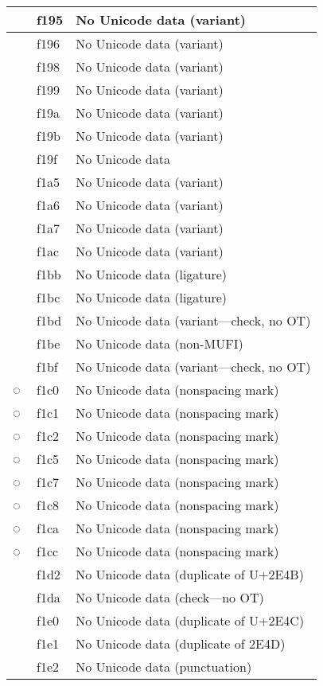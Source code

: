 \documentclass[12pt,letterpaper,openany]{book}
\begin{document}
\begin{center}
\begin{supertabular}{|m{0.25in}|m{0.5in}|m{4in}|}
 & f195 & No Unicode data (variant)\\\hline
 & f196 & No Unicode data (variant)\\\hline
 & f198 & No Unicode data (variant)\\\hline
 & f199 & No Unicode data (variant)\\\hline
 & f19a & No Unicode data (variant)\\\hline
 & f19b & No Unicode data (variant)\\\hline
 & f19f & No Unicode data\\\hline
 & f1a5 & No Unicode data (variant)\\\hline
 & f1a6 & No Unicode data (variant)\\\hline
 & f1a7 & No Unicode data (variant)\\\hline
 & f1ac & No Unicode data (variant)\\\hline
 & f1bb & No Unicode data (ligature)\\\hline
 & f1bc & No Unicode data (ligature)\\\hline
 & f1bd & No Unicode data (variant---check, no OT)\\\hline
 & f1be & No Unicode data (non-MUFI)\\\hline
 & f1bf & No Unicode data (variant---check, no OT)\\\hline
◌ & f1c0 & No Unicode data (nonspacing mark)\\\hline
◌ & f1c1 & No Unicode data (nonspacing mark)\\\hline
◌ & f1c2 & No Unicode data (nonspacing mark)\\\hline
◌ & f1c5 & No Unicode data (nonspacing mark)\\\hline
◌ & f1c7 & No Unicode data (nonspacing mark)\\\hline
◌ & f1c8 & No Unicode data (nonspacing mark)\\\hline
◌ & f1ca & No Unicode data (nonspacing mark)\\\hline
◌ & f1cc & No Unicode data (nonspacing mark)\\\hline
 & f1d2 & No Unicode data (duplicate of U+2E4B)\\\hline
 & f1da & No Unicode data (check---no OT)\\\hline
 & f1e0 & No Unicode data (duplicate of U+2E4C)\\\hline
 & f1e1 & No Unicode data (duplicate of 2E4D)\\\hline
 & f1e2 & No Unicode data (punctuation)\\\hline

\end{supertabular}
\end{center}
\end{document}

